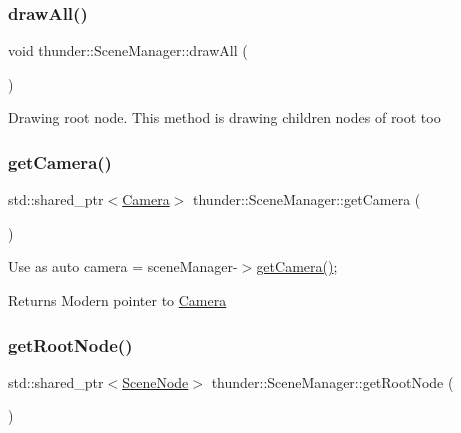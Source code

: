 \subsubsection{\texorpdfstring{draw\+All()}{drawAll()}}
{\footnotesize\ttfamily void thunder\+::\+Scene\+Manager\+::draw\+All (\begin{DoxyParamCaption}{ }\end{DoxyParamCaption})}

Drawing root node. This method is drawing children nodes of root too \mbox{\label{classthunder_1_1_scene_manager_aa1e30f8dc889837b6ee4220641554a02}} 
\subsubsection{\texorpdfstring{get\+Camera()}{getCamera()}}
{\footnotesize\ttfamily std\+::shared\+\_\+ptr$<$\mbox{\hyperlink{classthunder_1_1_camera}{Camera}}$>$ thunder\+::\+Scene\+Manager\+::get\+Camera (\begin{DoxyParamCaption}{ }\end{DoxyParamCaption})}

Use as {\ttfamily auto camera = scene\+Manager-\/$>$\mbox{\hyperlink{classthunder_1_1_scene_manager_aa1e30f8dc889837b6ee4220641554a02}{get\+Camera()}};}

\begin{DoxyReturn}{Returns}
Modern pointer to \mbox{\hyperlink{classthunder_1_1_camera}{Camera}} 
\end{DoxyReturn}
\mbox{\label{classthunder_1_1_scene_manager_a3cc5d2cbec1cb527ef71895c1ced1081}} 
\subsubsection{\texorpdfstring{get\+Root\+Node()}{getRootNode()}}
{\footnotesize\ttfamily std\+::shared\+\_\+ptr$<$\mbox{\hyperlink{classthunder_1_1_scene_node}{Scene\+Node}}$>$ thunder\+::\+Scene\+Manager\+::get\+Root\+Node (\begin{DoxyParamCaption}{ }\end{DoxyParamCaption})}

